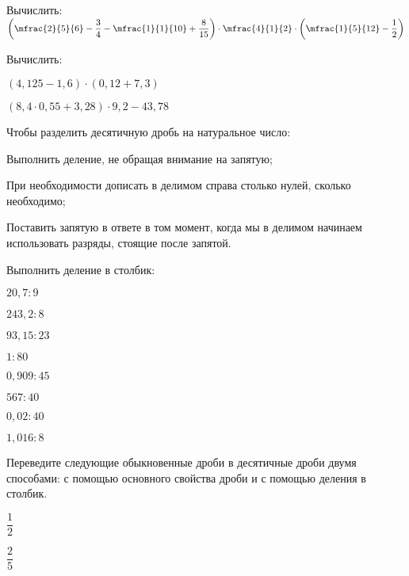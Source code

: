 %
%
\begin{class}[number=5]
	\begin{listofex}
		\item Вычислить:\quad\( \left( \mfrac{2}{5}{6}-\dfrac{3}{4}-\mfrac{1}{1}{10}+\dfrac{8}{15} \right)\cdot\mfrac{4}{1}{2}\cdot\left( \mfrac{1}{5}{12}-\dfrac{1}{2} \right) \)
		\item Вычислить:
		\begin{enumcols}[itemcolumns=2]
			\item \( (4,125-1,6)\cdot(0,12+7,3) \)
			\item \( (8,4\cdot0,55+3,28)\cdot9,2-43,78 \)
		\end{enumcols}
	\end{listofex}
	\begin{definit}
		Чтобы разделить десятичную дробь на натуральное число:
		\begin{enumcols}
			\item Выполнить деление, не обращая внимание на запятую;
			\item При необходимости дописать в делимом справа столько нулей,
			сколько необходимо;
			\item Поставить запятую в ответе в том момент, когда мы в делимом
			начинаем использовать разряды, стоящие после запятой.
		\end{enumcols}
	\end{definit}
	\begin{listofex}[resume]
		\item Выполнить деление в столбик:
		\begin{enumcols}[itemcolumns=4]
			\item \( 20,7:9 \)
			\item \( 243,2:8 \)
			\item \( 93,15:23 \)
			\item \( 1:80 \)
			\item \( 0,909:45 \)
			\item \( 567:40 \)
			\item \( 0,02:40 \)
			\item \( 1,016:8 \)
		\end{enumcols}
		\item Переведите следующие обыкновенные дроби в десятичные дроби двумя способами: с
		помощью основного свойства дроби и с помощью деления в столбик.
		\begin{enumcols}[itemcolumns=6]
			\item \( \dfrac{1}{2} \)
			\item \( \dfrac{2}{5} \)

\end{enumcols}
\end{listofex}
\end{class}

